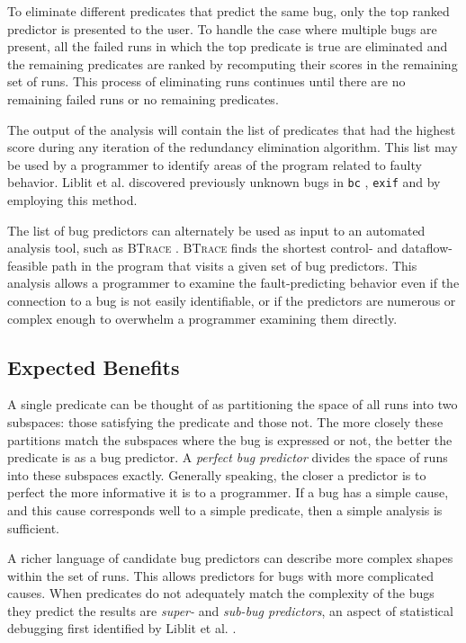 To eliminate different predicates that predict the same bug, only the top ranked predictor is presented to the user.  To handle the case where multiple bugs are present, all the failed runs in which the top predicate is true are eliminated and the remaining predicates are ranked by recomputing their scores in the remaining set of runs.  This process of eliminating runs continues until there are no remaining failed runs or no remaining predicates.

The output of the analysis will contain the list of predicates that had the highest score during any iteration of the redundancy elimination algorithm.  This list may be used by a programmer to identify areas of the program related to faulty behavior.  Liblit et al. discovered previously unknown bugs in \texttt{bc} \cite{Liblit:2003:BIRPS}, \texttt{exif} \cite{Liblit:2005:SSBI} and \rhythmbox \cite{Liblit:2005:SSBI} by employing this method.

The list of bug predictors can alternately be used as input to an automated analysis tool, such as \textsc{BTrace} \cite{Lal:2006:POPAD}. \textsc{BTrace} finds the shortest control- and dataflow-feasible path in the program that visits a given set of bug predictors.  This analysis allows a programmer to examine the fault-predicting behavior even if the connection to a bug is not easily identifiable, or if the predictors are numerous or complex enough to overwhelm a programmer examining them directly.

\subsection{Expected Benefits}
A single predicate can be thought of as partitioning the space of all runs into two subspaces: those satisfying the predicate and those not.  The more closely these partitions match the subspaces where the bug is expressed or not, the better the predicate is as a bug predictor.  A \emph{perfect bug predictor} divides the space of runs into these subspaces exactly.  Generally speaking, the closer a predictor is to perfect the more informative it is to a programmer.  If a bug has a simple cause, and this cause corresponds well to a simple predicate, then a simple analysis is sufficient.

A richer language of candidate bug predictors can describe more complex shapes within the set of runs.  This allows predictors for bugs with more complicated causes.  When predicates do not adequately match the complexity of the bugs they predict the results are \emph{super-} and \emph{sub-bug predictors}, an aspect of statistical debugging first identified by Liblit et al. \cite{Liblit:2005:SSBI}.

